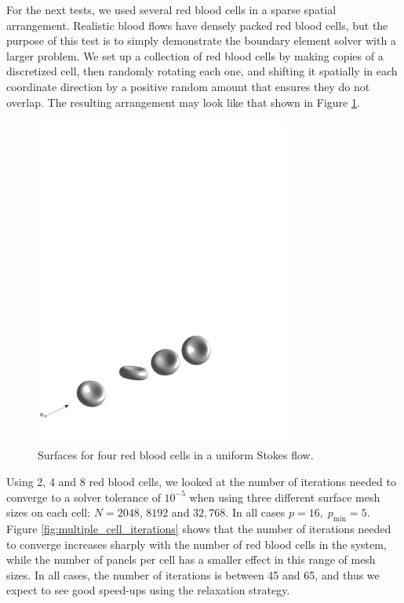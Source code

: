 \documentclass[final,leqno,]{siamltex1213}
\begin{document}
For the next tests, we used several red blood cells in a sparse spatial arrangement. Realistic blood flows have densely packed red blood cells, but the purpose of this test is to simply demonstrate the boundary element solver with a larger problem. We set up a collection of red blood cells by making copies of a discretized cell, then randomly rotating each one, and shifting it spatially in each  coordinate direction by a positive random amount that ensures they do not overlap. The resulting arrangement may look like that shown in Figure \ref{fig:multiple_cells}.

\begin{figure}[ht]
\begin{center}
\includegraphics[natwidth=6in,natheight=2.88in,width=0.75\textwidth]{4Cells_arrow.pdf}
	\caption{Surfaces for four red blood cells in a uniform Stokes flow.}
	\label{fig:multiple_cells}
\end{center}
\end{figure}

Using 2, 4 and 8 red blood cells, we looked at the number of iterations needed to converge to a solver tolerance of $10^{-5}$ when using three different surface mesh sizes on each cell: $N=2048$, $8192$ and $32,768$. In all cases $p = 16,\;p_{\text{min}} = 5$. Figure \ref{fig:multiple_cell_iterations} shows that the number of iterations needed to converge increases sharply with the number of red blood cells in the system, while the number of panels per cell has a smaller effect in this range of mesh sizes. In all cases, the number of iterations is between 45 and 65, and thus we expect to see good speed-ups using the relaxation strategy.
\end{document}
